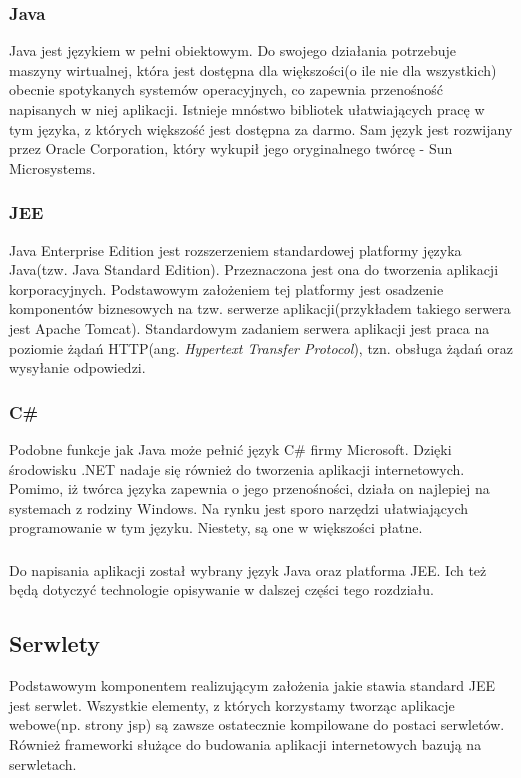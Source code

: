 \subsubsection{Java}
Java jest językiem w pełni obiektowym. Do swojego działania potrzebuje maszyny wirtualnej, która jest dostępna dla większości(o ile nie dla wszystkich) obecnie spotykanych systemów operacyjnych, co zapewnia przenośność napisanych w niej aplikacji. Istnieje mnóstwo bibliotek ułatwiających pracę w tym języka, z których większość jest dostępna za darmo. Sam język jest rozwijany przez Oracle Corporation, który wykupił jego oryginalnego twórcę - Sun Microsystems.

\subsubsection{JEE}
Java Enterprise Edition jest rozszerzeniem standardowej platformy języka Java(tzw. Java Standard Edition). Przeznaczona jest ona do tworzenia aplikacji korporacyjnych. Podstawowym założeniem tej platformy jest osadzenie komponentów biznesowych na tzw. serwerze aplikacji(przykładem takiego serwera jest Apache Tomcat). Standardowym zadaniem serwera aplikacji jest praca na poziomie żądań HTTP(ang. \textit{Hypertext Transfer Protocol}), tzn. obsługa żądań oraz wysyłanie odpowiedzi.

\subsubsection{C\#}
Podobne funkcje jak Java może pełnić język C\# firmy Microsoft. Dzięki środowisku .NET nadaje się również do tworzenia aplikacji internetowych. Pomimo, iż twórca języka zapewnia o jego przenośności, działa on najlepiej na systemach z rodziny Windows. Na rynku jest sporo narzędzi ułatwiających programowanie w tym języku. Niestety, są one w większości płatne.

\subsubsection{}
Do napisania aplikacji został wybrany język Java oraz platforma JEE. Ich też będą dotyczyć technologie opisywanie w dalszej części tego rozdziału.

\subsection[Serwlety][Serwlety]{Serwlety}
Podstawowym komponentem realizującym założenia jakie stawia standard JEE jest serwlet. Wszystkie elementy, z których korzystamy tworząc aplikacje webowe(np. strony jsp) są zawsze ostatecznie kompilowane do postaci serwletów. Również frameworki służące do budowania aplikacji internetowych bazują na serwletach.

